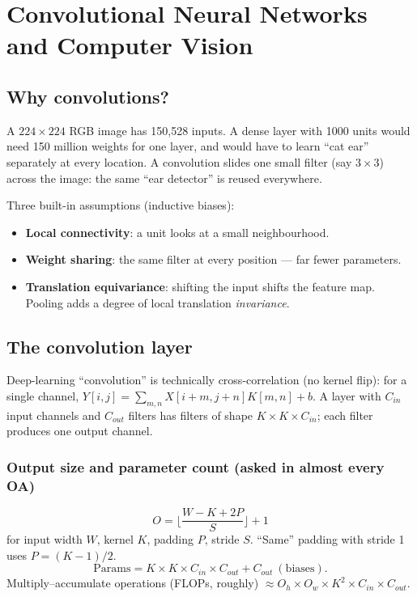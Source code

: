 \chapter{Convolutional Neural Networks and Computer Vision}

\section{Why convolutions?}
\begin{intuition}
A $224\times224$ RGB image has 150{,}528 inputs. A dense layer with 1000 units would need 150 million weights for one layer, and would have to learn ``cat ear'' separately at every location. A convolution slides one small filter (say $3\times3$) across the image: the same ``ear detector'' is reused everywhere.
\end{intuition}
Three built-in assumptions (inductive biases):
\begin{itemize}
  \item \textbf{Local connectivity}: a unit looks at a small neighbourhood.
  \item \textbf{Weight sharing}: the same filter at every position --- far fewer parameters.
  \item \textbf{Translation equivariance}: shifting the input shifts the feature map. Pooling adds a degree of local translation \emph{invariance}.
\end{itemize}

\section{The convolution layer}
Deep-learning ``convolution'' is technically cross-correlation (no kernel flip): for a single channel, $Y[i,j]=\sum_{m,n}X[i+m,j+n]K[m,n]+b$. A layer with $C_{in}$ input channels and $C_{out}$ filters has filters of shape $K\times K\times C_{in}$; each filter produces one output channel.

\subsection{Output size and parameter count (asked in almost every OA)}
\[O=\Big\lfloor\frac{W-K+2P}{S}\Big\rfloor+1\]
for input width $W$, kernel $K$, padding $P$, stride $S$. ``Same'' padding with stride 1 uses $P=(K-1)/2$.
\[\text{Params}=K\times K\times C_{in}\times C_{out}+C_{out}\ (\text{biases}).\]
Multiply--accumulate operations (FLOPs, roughly) $\approx O_h\times O_w\times K^2\times C_{in}\times C_{out}$.

